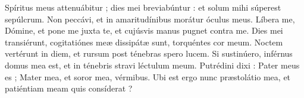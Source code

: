 \lettrine{S}{}píritus meus attenuábitur ; dies mei breviabúntur : et solum mihi súperest sepúlcrum.
Non peccávi, et in amaritudínibus morátur óculus meus.
Líbera me, Dómine, et pone me juxta te, et cujúsvis manus pugnet contra me.
Dies mei transiérunt, cogitatiónes meæ dissipátæ sunt, torquéntes cor meum.
Noctem vertérunt in diem, et rursum post ténebras spero lucem.
Si sustinúero, inférnus domus mea est, et in ténebris stravi léctulum meum.
Putrédini dixi : Pater meus es ; Mater mea, et soror mea, vérmibus.
Ubi est ergo nunc præstolátio mea, et patiéntiam meam quis consíderat ?